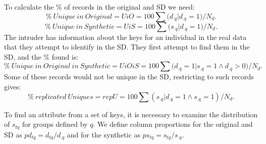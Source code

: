 \documentclass[12pt]{article}
\begin{document}
 To calculate the \% of records in the original and SD we need:
  \begin{equation}
\%~Unique~in~Original = UiO = 100\sum{(d_{.q} |d_{.q} = 1})/N_d. 
  \end{equation}
  \begin{equation}
  \%~Unique~in~Synthetic = UiS = 100\sum{(s_{.q} |d_{.q} = 1})/N_d.
    \end{equation}
    The intruder has information about the keys for an individual in the real data that they attempt to identify in the SD. They first attempt to find them in the SD, and  the \% found is:
      \begin{equation}
    \%~Unique~in~Original~in~Synthetic = UiOiS = 100 \sum{(d_{.q} = 1 |s_{.q} = 1 \land d_{.q} > 0})/N_d.
      \end{equation}
      Some of these records would not be unique in the SD, restricting to such records gives:
        \begin{equation}
      \%~replicated~Uniques = repU = 100\sum{(s_{.q} |d_{.q} = 1 \land s_{.q} = 1)}/N_d.
      \end{equation}
      
      To find an attribute from a set of keys, it is necessary to examine the distribution of $s_{tq}$ for groups defined by $q$. We define column proportions for the original and SD as $pd_{tq} = d_{tq}/d_{.q}$ and for the synthetic as $ps_{tq} = s_{tq}/s_{.q}$.
     
\end{document}

